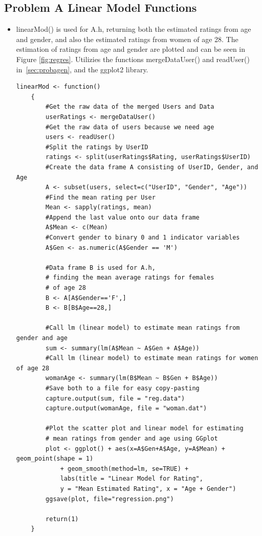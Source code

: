 \documentclass[11pt]{article}  %
\begin{document}
\subsection{Problem A Linear Model Functions}
\label{sec:probalin}
\begin{itemize}
    
    \item linearMod() is used for A.h, returning both the estimated ratings from age and gender, and also the estimated ratings from women of age 28. The estimation of ratings from age and gender are plotted and can be seen in Figure \ref{fig:regres}. Utilizies the functions mergeDataUser() and readUser() in~\ref{sec:probagen}, and the ggplot2 library.
    \begin{lstlisting}[basicstyle=\small]
    linearMod <- function()
    {
    	#Get the raw data of the merged Users and Data
    	userRatings <- mergeDataUser()
    	#Get the raw data of users because we need age
    	users <- readUser()
    	#Split the ratings by UserID
    	ratings <- split(userRatings$Rating, userRatings$UserID)	
    	#Create the data frame A consisting of UserID, Gender, and Age
    	A <- subset(users, select=c("UserID", "Gender", "Age"))
    	#Find the mean rating per User
    	Mean <- sapply(ratings, mean)
    	#Append the last value onto our data frame
    	A$Mean <- c(Mean)
    	#Convert gender to binary 0 and 1 indicator variables
    	A$Gen <- as.numeric(A$Gender == 'M')
    
    	#Data frame B is used for A.h, 
    	# finding the mean average ratings for females
    	# of age 28
    	B <- A[A$Gender=='F',]
    	B <- B[B$Age==28,]
    
    	#Call lm (linear model) to estimate mean ratings from gender and age
    	sum <- summary(lm(A$Mean ~ A$Gen + A$Age))
    	#Call lm (linear model) to estimate mean ratings for women of age 28
    	womanAge <- summary(lm(B$Mean ~ B$Gen + B$Age))
    	#Save both to a file for easy copy-pasting
    	capture.output(sum, file = "reg.data")
    	capture.output(womanAge, file = "woman.dat")
    
    	#Plot the scatter plot and linear model for estimating
    	# mean ratings from gender and age using GGplot
    	plot <- ggplot() + aes(x=A$Gen+A$Age, y=A$Mean) + geom_point(shape = 1)
    	    + geom_smooth(method=lm, se=TRUE) + 
    	    labs(title = "Linear Model for Rating", 
    	    y = "Mean Estimated Rating", x = "Age + Gender")
    	ggsave(plot, file="regression.png")
    
    	return(1)
    }
    \end{lstlisting}
\end{itemize}
\end{document}
